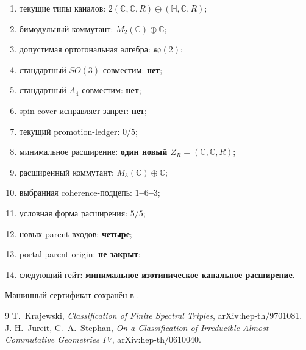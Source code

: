 \begin{protocol}\begin{enumerate}
\item текущие типы каналов: \textbf{$2(\mathbb C,\mathbb C,R)\oplus(\mathbb H,\mathbb C,R)$};
\item бимодульный коммутант: \textbf{$M_2(\mathbb C)\oplus\mathbb C$};
\item допустимая ортогональная алгебра: \textbf{$\mathfrak{so}(2)$};
\item стандартный $SO(3)$ совместим: \textbf{нет};
\item стандартный $A_4$ совместим: \textbf{нет};
\item spin-cover исправляет запрет: \textbf{нет};
\item текущий promotion-ledger: \textbf{$0/5$};
\item минимальное расширение: \textbf{один новый $Z_R=(\mathbb C,\mathbb C,R)$};
\item расширенный коммутант: \textbf{$M_3(\mathbb C)\oplus\mathbb C$};
\item выбранная coherence-подцепь: \textbf{$1$--$6$--$3$};
\item условная форма расширения: \textbf{$5/5$};
\item новых parent-входов: \textbf{четыре};
\item portal parent-origin: \textbf{не закрыт};
\item следующий гейт: \textbf{минимальное изотипическое канальное расширение}.
\end{enumerate}\end{protocol}

Машинный сертификат сохранён в
.

\begin{thebibliography}{9}
T.~Krajewski,
\emph{Classification of Finite Spectral Triples},
arXiv:hep-th/9701081.
J.-H.~Jureit, C.~A.~Stephan,
\emph{On a Classification of Irreducible Almost-Commutative Geometries IV},
arXiv:hep-th/0610040.
\end{thebibliography}